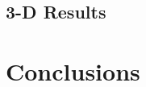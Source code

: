 {{    \subsection{3-D Results}{\label{ssec:Spatial Decomposition:3-D Results}
      \blindtext[4]
    }
  }
  \section{Conclusions}{\label{sec:Spatial Decomposition:Conclusions}
    \blindtext[4]
  }
}